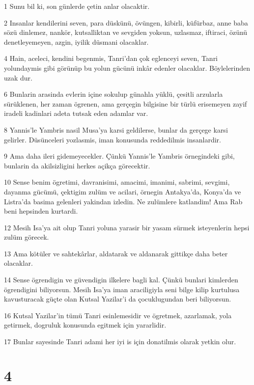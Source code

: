 \par 1 Sunu bil ki, son günlerde çetin anlar olacaktir.
\par 2 Insanlar kendilerini seven, para düskünü, övüngen, kibirli, küfürbaz, anne baba sözü dinlemez, nankör, kutsalliktan ve sevgiden yoksun, uzlasmaz, iftiraci, özünü denetleyemeyen, azgin, iyilik düsmani olacaklar.
\par 4 Hain, aceleci, kendini begenmis, Tanri'dan çok eglenceyi seven, Tanri yolundaymis gibi görünüp bu yolun gücünü inkâr edenler olacaklar. Böylelerinden uzak dur.
\par 6 Bunlarin arasinda evlerin içine sokulup günahla yüklü, çesitli arzularla sürüklenen, her zaman ögrenen, ama gerçegin bilgisine bir türlü erisemeyen zayif iradeli kadinlari adeta tutsak eden adamlar var.
\par 8 Yannis'le Yambris nasil Musa'ya karsi geldilerse, bunlar da gerçege karsi gelirler. Düsünceleri yozlasmis, iman konusunda reddedilmis insanlardir.
\par 9 Ama daha ileri gidemeyecekler. Çünkü Yannis'le Yambris örnegindeki gibi, bunlarin da akilsizligini herkes açikça görecektir.
\par 10 Sense benim ögretimi, davranisimi, amacimi, imanimi, sabrimi, sevgimi, dayanma gücümü, çektigim zulüm ve acilari, örnegin Antakya'da, Konya'da ve Listra'da basima gelenleri yakindan izledin. Ne zulümlere katlandim! Ama Rab beni hepsinden kurtardi.
\par 12 Mesih Isa'ya ait olup Tanri yoluna yarasir bir yasam sürmek isteyenlerin hepsi zulüm görecek.
\par 13 Ama kötüler ve sahtekârlar, aldatarak ve aldanarak gittikçe daha beter olacaklar.
\par 14 Sense ögrendigin ve güvendigin ilkelere bagli kal. Çünkü bunlari kimlerden ögrendigini biliyorsun. Mesih Isa'ya iman araciligiyla seni bilge kilip kurtulusa kavusturacak güçte olan Kutsal Yazilar'i da çocuklugundan beri biliyorsun.
\par 16 Kutsal Yazilar'in tümü Tanri esinlemesidir ve ögretmek, azarlamak, yola getirmek, dogruluk konusunda egitmek için yararlidir.
\par 17 Bunlar sayesinde Tanri adami her iyi is için donatilmis olarak yetkin olur.

\chapter{4}

